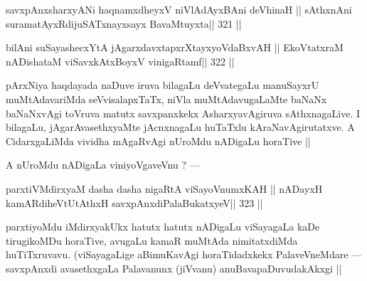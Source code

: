 \begin{shl}
\footnotemark[3]savxpAnxsharxyANi haqnamxdheyxV niVlAdAyxBAni deVhinaH ||
sAthxnAni suramatAyxRdijuSATxnayxsayx BavaMtuyxta\hfill || 321 ||
\end{shl}

\begin{shl}
bilAni suSayashecxYtA jAgarxdavxtapxrXtayxyoVdaBxvAH ||
EkoVtatxraM nADishataM viSavxkAtxBoyxV vinigaRtamf\hfill || 322 ||
\end{shl}

\begin{artha}
pArxNiya haqdayada naDuve iruva bilagaLu deVvategaLu manuSayxrU 
muMtAdavariMda seVvisalapxTaTx, niVla muMtAdavugaLaMte baNaNx 
baNaNxvAgi toVruva matutx savxpanxkekx AsharxyavAgiruva sAthxnagaLive. 
I bilagaLu, jAgarAvasethxyaMte jAcnxnagaLu huTaTxlu kAraNavAgirutatxve. A CidarxgaLiMda vividha mAgaRvAgi nUroMdu nADigaLu horaTive ||
\end{artha}

\begin{artha}
A nUroMdu nADigaLa viniyoVgaveVnu ? ---
\end{artha}


\begin{shl}
parxtiVMdirxyaM dasha dasha nigaRtA viSayoVnumxKAH ||
nADayxH kamARdiheVtUtAthxH savxpAnxdiPalaBukatxyeV\hfill || 323 ||
\end{shl}

\begin{artha}
parxtiyoMdu iMdirxyakUkx hatutx hatutx nADigaLu viSayagaLa kaDe 
tirugikoMDu horaTive, avugaLu kamaR muMtAda nimitatxdiMda huTiTxruvavu. (viSayagaLige aBimuKavAgi horaTidadxkekx PalaveVneMdare --- savxpAnxdi avasethxgaLa Palavanunx (jiVvanu) anuBavapaDuvudakAkxgi ||
\end{artha}

